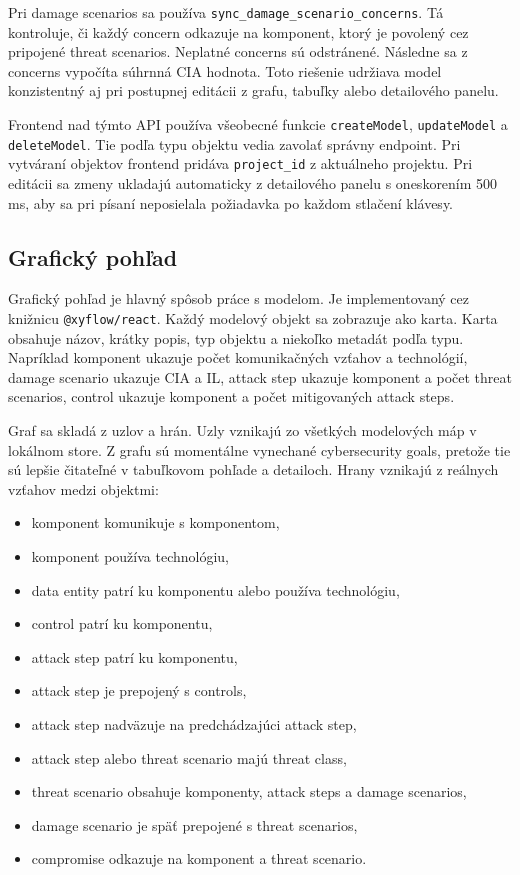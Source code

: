 \documentclass[11pt]{article}
\begin{document}
Pri damage scenarios sa používa \texttt{sync\_damage\_scenario\_concerns}. Tá kontroluje, či každý concern odkazuje na komponent, ktorý je povolený cez pripojené threat scenarios. Neplatné concerns sú odstránené. Následne sa z concerns vypočíta súhrnná CIA hodnota. Toto riešenie udržiava model konzistentný aj pri postupnej editácii z grafu, tabuľky alebo detailového panelu.

Frontend nad týmto API používa všeobecné funkcie \texttt{createModel}, \texttt{updateModel} a \texttt{deleteModel}. Tie podľa typu objektu vedia zavolať správny endpoint. Pri vytváraní objektov frontend pridáva \texttt{project\_id} z aktuálneho projektu. Pri editácii sa zmeny ukladajú automaticky z detailového panelu s oneskorením 500 ms, aby sa pri písaní neposielala požiadavka po každom stlačení klávesy.

\subsection{Grafický pohľad}

Grafický pohľad je hlavný spôsob práce s modelom. Je implementovaný cez knižnicu \texttt{@xyflow/react}. Každý modelový objekt sa zobrazuje ako karta. Karta obsahuje názov, krátky popis, typ objektu a niekoľko metadát podľa typu. Napríklad komponent ukazuje počet komunikačných vzťahov a technológií, damage scenario ukazuje CIA a IL, attack step ukazuje komponent a počet threat scenarios, control ukazuje komponent a počet mitigovaných attack steps.

Graf sa skladá z uzlov a hrán. Uzly vznikajú zo všetkých modelových máp v lokálnom store. Z grafu sú momentálne vynechané cybersecurity goals, pretože tie sú lepšie čitateľné v tabuľkovom pohľade a detailoch. Hrany vznikajú z reálnych vzťahov medzi objektmi:

\begin{itemize}
    \item komponent komunikuje s komponentom,
    \item komponent používa technológiu,
    \item data entity patrí ku komponentu alebo používa technológiu,
    \item control patrí ku komponentu,
    \item attack step patrí ku komponentu,
    \item attack step je prepojený s controls,
    \item attack step nadväzuje na predchádzajúci attack step,
    \item attack step alebo threat scenario majú threat class,
    \item threat scenario obsahuje komponenty, attack steps a damage scenarios,
    \item damage scenario je späť prepojené s threat scenarios,
    \item compromise odkazuje na komponent a threat scenario.
\end{itemize}
\end{document}
